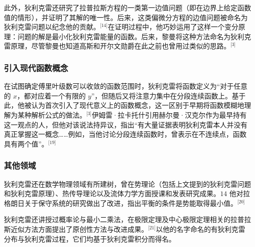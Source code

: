 此外，狄利克雷还研究了拉普拉斯方程的一类第一边值问题（即在边界上给定函数值的情形），并证明了其解的唯一性。后来，这类偏微分方程的边值问题被命名为狄利克雷问题以纪念他的贡献。\(^\text{[14]}\)在证明过程中，他巧妙运用了这样一个变分原理：问题的解是最小化狄利克雷能量的函数。后来，黎曼将这种方法命名为狄利克雷原理，尽管黎曼也知道高斯和开尔文勋爵在此之前也曾用过类似的思路。\(^\text{[3]}\)
\subsubsection{引入现代函数概念}
在试图确定傅里叶级数可以收敛的函数范围时，狄利克雷将函数定义为“对于任意的 $x$，都对应着一个有限的 $y$”，但随后又将注意力集中在分段连续函数上。基于此，他被认为首次引入了现代意义上的函数概念，这一区别于早期将函数模糊地理解为某种解析公式的做法。\(^\text{[3]}\)伊姆雷·拉卡托什引用赫尔曼·汉克尔作为最早持有这一观点的人，但他对该说法持异议，指出“有大量证据表明狄利克雷本人并没有真正掌握这一概念……例如，当他讨论分段连续函数时，曾表示在不连续点，函数具有两个值”。\(^\text{[19]}\)
\subsubsection{其他领域}
狄利克雷还在数学物理领域有所建树，曾在势理论（包括上文提到的狄利克雷问题和狄利克雷原理）、热传导理论以及流体力学方面授课和发表研究成果。$14$ 他对拉格朗日关于保守系统的研究做出了改进，指出平衡的条件是势能取得最小值。\(^\text{[20]}\)

狄利克雷还讲授过概率论与最小二乘法，在极限定理及中心极限定理相关的拉普拉斯近似方法方面提出了原创性方法与改进成果。\(^\text{[21]}\)以他的名字命名的有狄利克雷分布与狄利克雷过程，它们均基于狄利克雷积分而得名。

